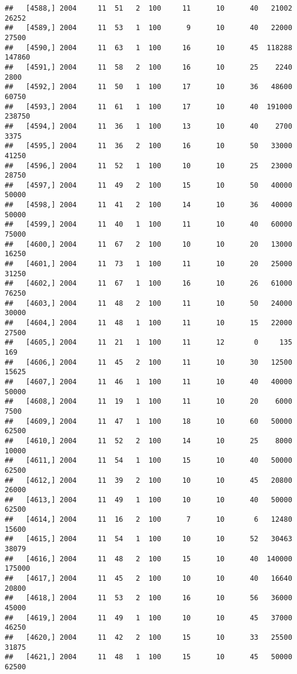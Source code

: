 \documentclass{article}\usepackage[]{graphicx}\usepackage[]{color}
\makeatletter
\newenvironment{kframe}{%
 \def\at@end@of@kframe{}%
 \ifinner\ifhmode%
  \def\at@end@of@kframe{\end{minipage}}%
  \begin{minipage}{\columnwidth}%
 \fi\fi%
 \def\FrameCommand##1{\hskip\@totalleftmargin \hskip-\fboxsep
 \colorbox{shadecolor}{##1}\hskip-\fboxsep
     \hskip-\linewidth \hskip-\@totalleftmargin \hskip\columnwidth}%
 \MakeFramed {\advance\hsize-\width
   \@totalleftmargin\z@ \linewidth\hsize
   \@setminipage}}%
 {\par\unskip\endMakeFramed%
 \at@end@of@kframe}
\newenvironment{knitrout}{}{} %
\makeatother
\begin{document}
\begin{knitrout}
\begin{kframe}
\begin{verbatim}
##   [4588,] 2004     11  51   2  100     11      10      40   21002   26252
##   [4589,] 2004     11  53   1  100      9      10      40   22000   27500
##   [4590,] 2004     11  63   1  100     16      10      45  118288  147860
##   [4591,] 2004     11  58   2  100     16      10      25    2240    2800
##   [4592,] 2004     11  50   1  100     17      10      36   48600   60750
##   [4593,] 2004     11  61   1  100     17      10      40  191000  238750
##   [4594,] 2004     11  36   1  100     13      10      40    2700    3375
##   [4595,] 2004     11  36   2  100     16      10      50   33000   41250
##   [4596,] 2004     11  52   1  100     10      10      25   23000   28750
##   [4597,] 2004     11  49   2  100     15      10      50   40000   50000
##   [4598,] 2004     11  41   2  100     14      10      36   40000   50000
##   [4599,] 2004     11  40   1  100     11      10      40   60000   75000
##   [4600,] 2004     11  67   2  100     10      10      20   13000   16250
##   [4601,] 2004     11  73   1  100     11      10      20   25000   31250
##   [4602,] 2004     11  67   1  100     16      10      26   61000   76250
##   [4603,] 2004     11  48   2  100     11      10      50   24000   30000
##   [4604,] 2004     11  48   1  100     11      10      15   22000   27500
##   [4605,] 2004     11  21   1  100     11      12       0     135     169
##   [4606,] 2004     11  45   2  100     11      10      30   12500   15625
##   [4607,] 2004     11  46   1  100     11      10      40   40000   50000
##   [4608,] 2004     11  19   1  100     11      10      20    6000    7500
##   [4609,] 2004     11  47   1  100     18      10      60   50000   62500
##   [4610,] 2004     11  52   2  100     14      10      25    8000   10000
##   [4611,] 2004     11  54   1  100     15      10      40   50000   62500
##   [4612,] 2004     11  39   2  100     10      10      45   20800   26000
##   [4613,] 2004     11  49   1  100     10      10      40   50000   62500
##   [4614,] 2004     11  16   2  100      7      10       6   12480   15600
##   [4615,] 2004     11  54   1  100     10      10      52   30463   38079
##   [4616,] 2004     11  48   2  100     15      10      40  140000  175000
##   [4617,] 2004     11  45   2  100     10      10      40   16640   20800
##   [4618,] 2004     11  53   2  100     16      10      56   36000   45000
##   [4619,] 2004     11  49   1  100     10      10      45   37000   46250
##   [4620,] 2004     11  42   2  100     15      10      33   25500   31875
##   [4621,] 2004     11  48   1  100     15      10      45   50000   62500

\end{verbatim}
\end{kframe}
\end{knitrout}
\end{document}
